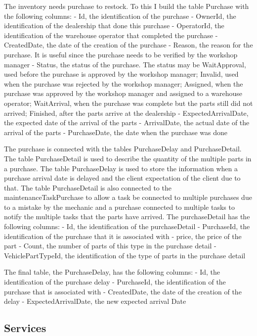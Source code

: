 The inventory needs purchase to restock. To this I build the table Purchase with the following columns:
- Id, the identification of the purchase
- OwnerId, the identification of the dealership that done this purchase
- OperatorId, the identification of the warehouse operator that completed the purchase
- CreatedDate, the date of the creation of the purchase
- Reason, the reason for the purchase. It is useful since the purchase needs to be verified by the workshop manager
- Status, the status of the purchase. The status may be WaitApproval, used before the purchase is approved by the workshop manager; Invalid, used when the purchase was rejected by the workshop manager; Assigned, when the purchase was approved by the workshop manager and assigned to a warehouse operator; WaitArrival, when the purchase was complete but the parts still did not arrived; Finished, after the parts arrive at the dealership
- ExpectedArrivalDate, the expected date of the arrival of the parts
- ArrivalDate, the actual date of the arrival of the parts
- PurchaseDate, the date when the purchase was done

The purchase is connected with the tables PurchaseDelay and PurchaseDetail. 
The table PurchaseDetail is used to describe the quantity of the multiple parts in a purchase.
The table PurchaseDelay is used to store the information when a purchase arrival date is delayed and the client expectation of the client due to that.
The table PurchaseDetail is also connected to the maintenanceTaskPurchase to allow a task be connected to multiple purchases due to a mistake by the mechanic and a purchase connected to multiple tasks to notify the multiple tasks that the parts have arrived.
The purchaseDetail has the following columns:
- Id, the identification of the purchaseDetail
- PurchaseId, the identification of the purchase that it is associated with
- price, the price of the part
- Count, the number of parts of this type in the purchase detail
- VehiclePartTypeId, the identification of the type of parts in the purchase detail
  
The final table, the PurchaseDelay, has the following columns:
- Id, the identification of the purchase delay
- PurchaseId, the identification of the purchase that is associated with
- CreatedDate, the date of the creation of the delay
- ExpectedArrivalDate, the new expected arrival Date


\subsection{Services} 


